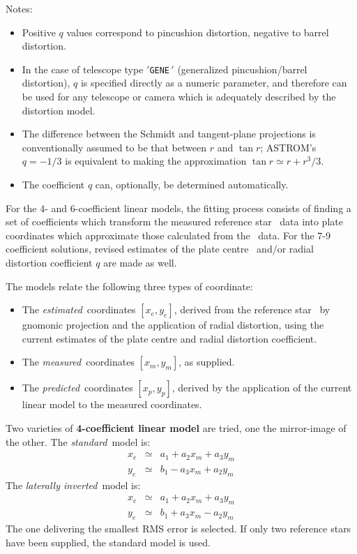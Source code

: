 \goodbreak
Notes:
\begin{itemize}
 \item Positive $q$ values correspond to pincushion distortion,
       negative to barrel distortion.
 \item In the case of telescope type $'${\tt GENE}$\,'$
       (generalized pincushion/barrel distortion), $q$ is specified
       directly as a numeric parameter, and therefore can be used for
       any telescope or camera which is adequately described by
       the distortion model.
 \item The difference between the Schmidt and tangent-plane
       projections is conventionally assumed to be that between $r$
       and $\tan r$; ASTROM's $q = -1/3$ is equivalent to
       making the approximation $\tan r \simeq r + r^3/3$.
 \item The coefficient $q$ can, optionally, be determined automatically.
\end{itemize}

For the 4- and 6-coefficient linear models, the fitting process
consists of finding a set of coefficients which transform
the measured reference star \xy\ data into plate coordinates
which approximate those calculated from the \radec\ data.
For the 7-9 coefficient solutions, revised estimates of
the plate centre \radec\ and/or radial distortion
coefficient $q$ are made as well.

The models relate the following three types of coordinate:
\begin{itemize}
 \item The {\it estimated}\, coordinates $[x_{e},y_{e}]$, derived
       from the reference star \radec\
       by gnomonic projection and the application of radial
       distortion, using the current estimates of the plate centre
       and radial distortion coefficient.
 \item The {\it measured}\, coordinates $[x_{m},y_{m}]$, as supplied.
 \item The {\it predicted}\, coordinates $[x_{p},y_{p}]$, derived by the
       application of the current linear model to the measured coordinates.
\end{itemize}

Two varieties of {\bf 4-coefficient linear model} are tried, one
the mirror-image of the other.  The {\it standard}\, model is:
\begin{eqnarray*}
x_{e} & \simeq & a_{1} + a_{2} x_{m} + a_{3} y_{m} \\
y_{e} & \simeq & b_{1} - a_{3} x_{m} + a_{2} y_{m}
\end{eqnarray*}
The {\it laterally inverted}\, model is:
\begin{eqnarray*}
x_{e} & \simeq & a_{1} + a_{2} x_{m} + a_{3} y_{m} \\
y_{e} & \simeq & b_{1} + a_{3} x_{m} - a_{2} y_{m}
\end{eqnarray*}
The one delivering the smallest RMS error is selected.  If only
two reference stars have been supplied, the standard model is
used.

